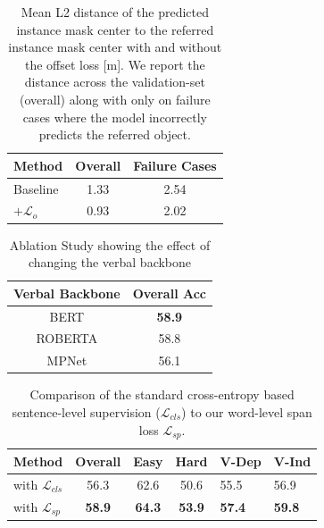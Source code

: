 \documentclass[10pt,twocolumn,letterpaper]{article}
\begin{document}
\begin{table}[t]
  \centering
  \tabcolsep=0.67cm
  \begin{tabular}{|l|c|c|}
    \hline
    Method & Overall & Failure Cases  \\
    \hline
    Baseline & 1.33 & 2.54\\ %
    $ + \mathcal{L}_o$ & 0.93 & 2.02 \\ %
    \hline
  \end{tabular}
  \caption{Mean L2 distance of the predicted instance mask center to the referred instance mask center with and without the offset loss [m]. We report the distance across the validation-set (overall) along with only on failure cases where the model incorrectly predicts the referred object.}
  \label{tab:ablation_offsetloss}
\end{table}
\begin{table}[]
    \centering
    \begin{tabular}{|c|c|}
    \hline
        Verbal Backbone & Overall Acc  \\
          \hline
          BERT\cite{devlin2018bert} & \textbf{58.9} \\
          ROBERTA \cite{liu2019roberta} & {58.8} \\
          MPNet\cite{song2020mpnet} & 56.1 \\
          \hline
    \end{tabular}
        \caption{Ablation Study showing the effect of changing the verbal backbone}

    \label{tab:verbal_backbone}
\end{table}
\begin{table}[ht]
  \centering
  \begin{tabular}{|l|c|cc p{1cm}  p{1cm}|}
    \hline
     Method & Overall & Easy& Hard & V-Dep & V-Ind   \\
    \hline
    with $\mathcal{L}_{cls}$  & 56.3 & 62.6 & 50.6 & 55.5 & 56.9\\ %
    with $\mathcal{L}_{sp}$ &  \textbf{58.9} & \textbf{64.3} & \textbf{53.9} & \textbf{57.4} & \textbf{59.8} \\
    \hline
  \end{tabular}
  \caption{Comparison of the standard cross-entropy based sentence-level supervision ($\mathcal{L}_{cls}$) to our word-level span loss $\mathcal{L}_{sp}$.}
  \label{tab:SpanlossvsCls}
\end{table} 
\end{document}
